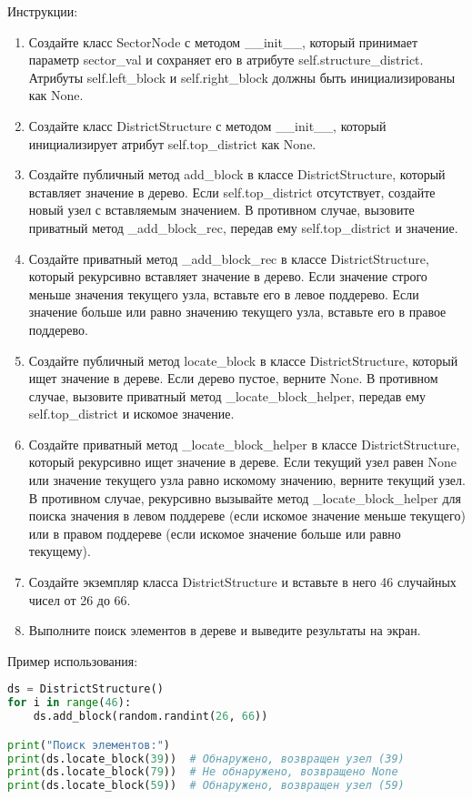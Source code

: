 \begin{enumerate}
Инструкции:
\begin{enumerate}
    \item Создайте класс SectorNode с методом \_\_init\_\_, который принимает параметр sector\_val и сохраняет его в атрибуте self.structure\_district. Атрибуты self.left\_block и self.right\_block должны быть инициализированы как None.
    \item Создайте класс DistrictStructure с методом \_\_init\_\_, который инициализирует атрибут self.top\_district как None.
    \item Создайте публичный метод add\_block в классе DistrictStructure, который вставляет значение в дерево. Если self.top\_district отсутствует, создайте новый узел с вставляемым значением. В противном случае, вызовите приватный метод \_add\_block\_rec, передав ему self.top\_district и значение.
    \item Создайте приватный метод \_add\_block\_rec в классе DistrictStructure, который рекурсивно вставляет значение в дерево. Если значение строго меньше значения текущего узла, вставьте его в левое поддерево. Если значение больше или равно значению текущего узла, вставьте его в правое поддерево.
    \item Создайте публичный метод locate\_block в классе DistrictStructure, который ищет значение в дереве. Если дерево пустое, верните None. В противном случае, вызовите приватный метод \_locate\_block\_helper, передав ему self.top\_district и искомое значение.
    \item Создайте приватный метод \_locate\_block\_helper в классе DistrictStructure, который рекурсивно ищет значение в дереве. Если текущий узел равен None или значение текущего узла равно искомому значению, верните текущий узел. В противном случае, рекурсивно вызывайте метод \_locate\_block\_helper для поиска значения в левом поддереве (если искомое значение меньше текущего) или в правом поддереве (если искомое значение больше или равно текущему).
    \item Создайте экземпляр класса DistrictStructure и вставьте в него 46 случайных чисел от 26 до 66.
    \item Выполните поиск элементов в дереве и выведите результаты на экран.
\end{enumerate}

Пример использования:
\begin{lstlisting}[language=Python]
ds = DistrictStructure()
for i in range(46):
    ds.add_block(random.randint(26, 66))

print("Поиск элементов:")
print(ds.locate_block(39))  # Обнаружено, возвращен узел (39)
print(ds.locate_block(79))  # Не обнаружено, возвращено None
print(ds.locate_block(59))  # Обнаружено, возвращен узел (59)
\end{lstlisting}


\end{enumerate}
